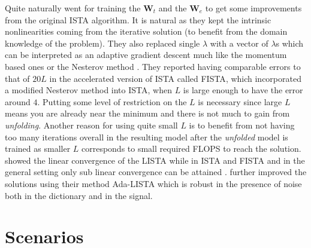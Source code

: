 Quite naturally \cite{Gregor2010} went for training the $\boldsymbol{W}_t$ and the $\boldsymbol{W}_e$ to get some improvements 
from the original \ac{ISTA}\cite{Daubechies2003} algorithm. It is natural as they kept the intrinsic 
nonlinearities coming from the iterative solution (to benefit from the domain knowledge of the problem). 
They also replaced single $\lambda$ with a vector of $\lambda$s which can be interpreted as an adaptive gradient descent 
much like the momentum based ones \cite{Boyd2004}\cite{Nocedal2006} or the Nesterov method \cite{Nesterov2004}\cite{Nesterov2018}. 
They reported having comparable errors to that of $20L$ in the accelerated version of 
\ac{ISTA}\cite{Daubechies2003} called \ac{FISTA}\cite{Beck2009}, which incorporated a modified Nesterov method 
\cite{Nesterov2004}\cite{Nesterov2018} into \ac{ISTA}, when $L$ is large enough to have the error around $4$. Putting some level of 
restriction on the $L$ is necessary since large $L$ means you are already near the minimum and there is not much to gain 
from \emph{unfolding}. Another reason for using quite small $L$ is to benefit from not having too many iterations 
overall in the resulting model after the \emph{unfolded} model is trained as smaller $L$ corresponds to 
small required \ac{FLOPS} to reach the solution. \cite{Chen2018} showed the 
linear convergence of the \ac{LISTA} while in \ac{ISTA} and \ac{FISTA} 
and in the general setting only sub linear convergence can be attained \cite{Daubechies2003}\cite{Beck2009}. \cite{Aberdam2020} further 
improved the solutions using their method \ac{Ada-LISTA} which is robust in the presence of noise both 
in the dictionary and in the signal.


\section{Scenarios}

